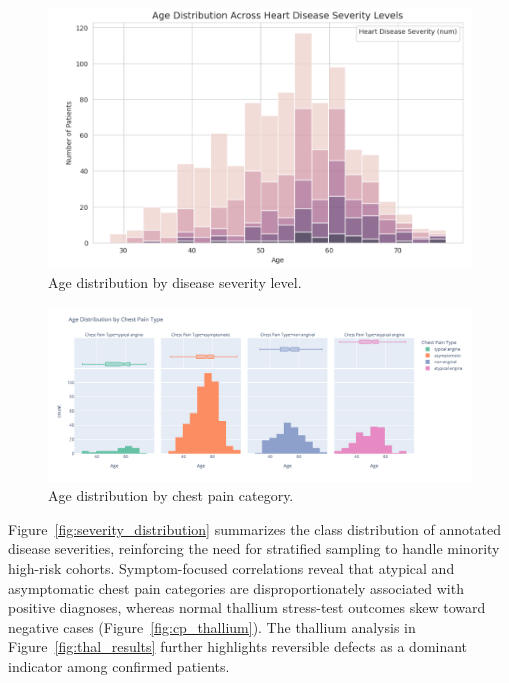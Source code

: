 \documentclass[12pt]{article}
\begin{document}
\begin{figure}[t]
  \centering
  \includegraphics[width=0.85\linewidth]{age_distribution_by_severity_levels.png}
  \caption{Age distribution by disease severity level.}
  \label{fig:age_severity}
\end{figure}

\begin{figure}[t]
  \centering
  \includegraphics[width=0.85\linewidth]{age_distribution_by_chest_pain_type.png}
  \caption{Age distribution by chest pain category.}
  \label{fig:age_cp}
\end{figure}

Figure~\ref{fig:severity_distribution} summarizes the class distribution of annotated disease severities, reinforcing the need for stratified sampling to handle minority high-risk cohorts. Symptom-focused correlations reveal that atypical and asymptomatic chest pain categories are disproportionately associated with positive diagnoses, whereas normal thallium stress-test outcomes skew toward negative cases (Figure~\ref{fig:cp_thallium}). The thallium analysis in Figure~\ref{fig:thal_results} further highlights reversible defects as a dominant indicator among confirmed patients.
\end{document}
